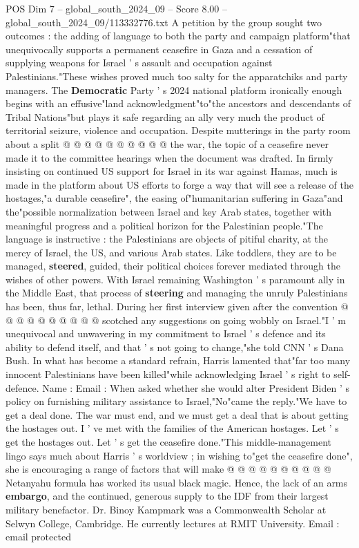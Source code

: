 \begin{textsample}{POS Dim 7 – global\_south\_2024\_09 – Score 8.00 – global\_south\_2024\_09/113332776.txt}
A petition by the group sought two outcomes : the adding of language to both the party and campaign platform"that unequivocally supports a permanent ceasefire in Gaza and a cessation of supplying weapons for Israel ' s assault and occupation against Palestinians."These wishes proved much too salty for the apparatchiks and party managers.
The \textbf{Democratic} Party ' s 2024 national platform ironically enough begins with an effusive"land acknowledgment"to"the ancestors and descendants of Tribal Nations"but plays it safe regarding an ally very much the product of territorial seizure, violence and occupation.
Despite mutterings in the party room about a split @ @ @ @ @ @ @ @ @ @ the war, the topic of a ceasefire never made it to the committee hearings when the document was drafted.
In firmly insisting on continued US support for Israel in its war against Hamas, much is made in the platform about US efforts to forge a way that will see a release of the hostages,"a durable ceasefire", the easing of"humanitarian suffering in Gaza"and the"possible normalization between Israel and key Arab states, together with meaningful progress and a political horizon for the Palestinian people."The language is instructive : the Palestinians are objects of pitiful charity, at the mercy of Israel, the US, and various Arab states.
Like toddlers, they are to be managed, \textbf{steered}, guided, their political choices forever mediated through the wishes of other powers.
With Israel remaining Washington ' s paramount ally in the Middle East, that process of \textbf{steering} and managing the unruly Palestinians has been, thus far, lethal.
During her first interview given after the convention @ @ @ @ @ @ @ @ @ @ scotched any suggestions on going wobbly on Israel."I ' m unequivocal and unwavering in my commitment to Israel ' s defence and its ability to defend itself, and that ' s not going to change,"she told CNN ' s Dana Bush.
In what has become a standard refrain, Harris lamented that"far too many innocent Palestinians have been killed"while acknowledging Israel ' s right to self-defence.
Name : Email : When asked whether she would alter President Biden ' s policy on furnishing military assistance to Israel,"No"came the reply."We have to get a deal done.
The war must end, and we must get a deal that is about getting the hostages out.
I ' ve met with the families of the American hostages.
Let ' s get the hostages out.
Let ' s get the ceasefire done."This middle-management lingo says much about Harris ' s worldview ; in wishing to"get the ceasefire done", she is encouraging a range of factors that will make @ @ @ @ @ @ @ @ @ @ Netanyahu formula has worked its usual black magic.
Hence, the lack of an arms \textbf{embargo}, and the continued, generous supply to the IDF from their largest military benefactor.
Dr.
Binoy Kampmark was a Commonwealth Scholar at Selwyn College, Cambridge.
He currently lectures at RMIT University.
Email : email protected

\end{textsample}
